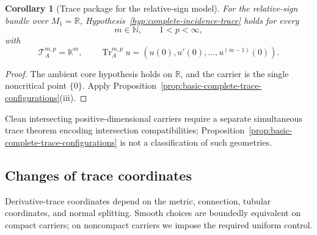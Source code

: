 \documentclass[11pt]{article}
\theoremstyle{plain}
\newtheorem{corollary}[theorem]{Corollary}
\theoremstyle{definition}
\begin{document}
\begin{corollary}[Trace package for the relative-sign model]
\label{cor:relative-sign-complete-trace-package}
For the relative-sign bundle over \(M_1=\mathbb R\),
Hypothesis~\ref{hyp:complete-incidence-trace} holds for every
\[
  m\in\mathbb N,
  \qquad
  1<p<\infty,
\]
with
\[
  \mathcal T_A^{m,p}
  =
  \mathbb K^m,
  \qquad
  \operatorname{Tr}_A^{m,p}u
  =
  \left(
    u(0),u'(0),\ldots,u^{(m-1)}(0)
  \right).
\]
\end{corollary}

\begin{proof}
The ambient core hypothesis holds on \(\mathbb R\), and the carrier is
the single noncritical point \(\{0\}\). Apply
Proposition~\ref{prop:basic-complete-trace-configurations}\textup{(iii)}.
\end{proof}

Clean intersecting positive-dimensional carriers require a separate simultaneous trace theorem encoding intersection compatibilities; Proposition~\ref{prop:basic-complete-trace-configurations} is not a classification of such geometries.

\subsection{Changes of trace coordinates}
\label{subsec:trace-coordinate-invariance}

Derivative-trace coordinates depend on the metric, connection, tubular coordinates, and normal splitting. Smooth choices are boundedly equivalent on compact carriers; on noncompact carriers we impose the required uniform control.
\end{document}
